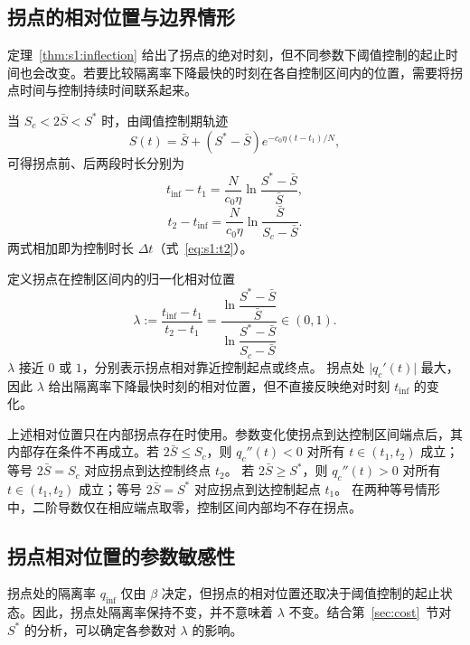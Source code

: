 \documentclass[lang=cn,a4paper,newtx]{elegantpaper}
\numberwithin{equation}{section}
\theoremstyle{plain}
\newcommand{\qinf}{q_{\mathrm{inf}}}
\begin{document}
\subsection{拐点的相对位置与边界情形}
\label{sec:s1:inflection-position}
定理~\ref{thm:s1:inflection} 给出了拐点的绝对时刻，但不同参数下阈值控制的起止时间也会改变。若要比较隔离率下降最快的时刻在各自控制区间内的位置，需要将拐点时间与控制持续时间联系起来。

当 $S_c<2\bar S<S^*$ 时，由阈值控制期轨迹
\[
S(t)=\bar S+(S^*-\bar S)e^{-c_0\eta(t-t_1)/N},
\]
可得拐点前、后两段时长分别为
\begin{equation}
t_{\mathrm{inf}}-t_1
=
\frac{N}{c_0\eta}
\ln\frac{S^*-\bar S}{\bar S},
\label{eq:s1:seg-high}
\end{equation}
\begin{equation}
t_2-t_{\mathrm{inf}}
=
\frac{N}{c_0\eta}
\ln\frac{\bar S}{S_c-\bar S}.
\label{eq:s1:seg-low}
\end{equation}
两式相加即为控制时长 $\Delta t$（式~\eqref{eq:s1:t2}）。

定义拐点在控制区间内的归一化相对位置
\begin{equation}
\lambda
:=
\frac{t_{\mathrm{inf}}-t_1}{t_2-t_1}
=
\frac{
\ln\dfrac{S^*-\bar S}{\bar S}
}{
\ln\dfrac{S^*-\bar S}{S_c-\bar S}
}
\in(0,1).
\label{eq:s1:lambda}
\end{equation}
$\lambda$ 接近 $0$ 或 $1$，分别表示拐点相对靠近控制起点或终点。
拐点处 $\lvert q_c'(t)\rvert$ 最大，因此 $\lambda$ 给出隔离率下降最快时刻的相对位置，但不直接反映绝对时刻 $t_{\mathrm{inf}}$ 的变化。

上述相对位置只在内部拐点存在时使用。参数变化使拐点到达控制区间端点后，其内部存在条件不再成立。若 $2\bar S\le S_c$，则 $q_c''(t)<0$ 对所有 $t\in(t_1,t_2)$ 成立；等号 $2\bar S=S_c$ 对应拐点到达控制终点 $t_2$。
若 $2\bar S\ge S^*$，则 $q_c''(t)>0$ 对所有 $t\in(t_1,t_2)$ 成立；等号 $2\bar S=S^*$ 对应拐点到达控制起点 $t_1$。
在两种等号情形中，二阶导数仅在相应端点取零，控制区间内部均不存在拐点。

\subsection{拐点相对位置的参数敏感性}
拐点处的隔离率 $\qinf$ 仅由 $\beta$ 决定，但拐点的相对位置还取决于阈值控制的起止状态。因此，拐点处隔离率保持不变，并不意味着 $\lambda$ 不变。结合第~\ref{sec:cost}~节对 $S^*$ 的分析，可以确定各参数对 $\lambda$ 的影响。
\end{document}
